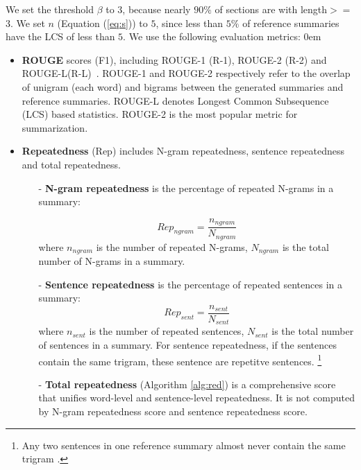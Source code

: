 We set the threshold $\beta$ to $3$, 
because nearly $90\%$ 
of sections are with length$>=$3.
We set $n$ (Equation (\ref{eq:s})) to $5$,
since less than $5\%$ of reference summaries have
the LCS of less than $5$.
We use the following evaluation metrics:
\itemsep0em
\begin{itemize}

\item \textbf{ROUGE} scores (F1), including ROUGE-1 (R-1), ROUGE-2 (R-2) and
ROUGE-L(R-L)~\citep{rouge-a-package-for-automatic-evaluation-of-summaries}.
ROUGE-1 and ROUGE-2 respectively refer to the overlap of unigram (each word) and bigrams between the generated summaries and reference summaries.
ROUGE-L denotes Longest Common Subsequence (LCS) based statistics.
ROUGE-2 is the most popular metric for summarization.

\item \textbf{Repeatedness} (Rep) 
includes N-gram repeatedness, sentence repeatedness
and total repeatedness.
\begin{itemize}
\item[-] \textbf{N-gram repeatedness} is the percentage of repeated N-grams 
in a summary:

\begin{equation}
Rep_{ngram} = \frac{n_{ngram}}{N_{ngram}}
\end{equation}
where $n_{ngram}$ is the number of repeated N-grams, 
$N_{ngram}$ is the total number of N-grams in a summary.
\item[-] \textbf{Sentence repeatedness} is the percentage of repeated 
sentences in a summary:
\begin{equation}
Rep_{sent} = \frac{n_{sent}}{N_{sent}}
\end{equation}
where $n_{sent}$ is the number of repeated sentences, 
$N_{sent}$ is the total number of sentences in a summary.
For sentence repeatedness, if the sentences contain the same trigram,
these sentence are repetitve sentences.
\footnote{
Any two sentences in one reference summary almost never contain 
the same trigram \citep{PaulusXS17}.}
\item[-] 
\textbf{Total repeatedness} (Algorithm \ref{alg:red}) is a comprehensive score
that unifies word-level and sentence-level repeatedness.
It is not computed by N-gram repeatedness score 
and sentence repeatedness score.


\end{itemize}
\end{itemize}
